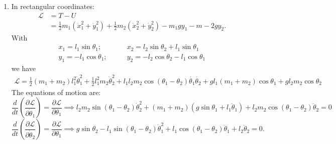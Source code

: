 \documentclass{article}
\theoremstyle{definition}
\newcommand{\p}{\partial}
\newcommand{\lag}{\mathcal{L}}
\newcommand{\f}[2]{\frac{#1}{#2}}
\newcommand{\lp}{\left(}
\newcommand{\rp}{\right)}
\begin{document}
\begin{enumerate}[label=(\alph*)]
	\item In rectangular coordinates:
	\begin{align*}
	\lag 
	&= T - U \\
	&= \f{1}{2}m_1(\dot{x}_1^2 + \dot{y}_1^2) + \f{1}{2}m_2(\dot{x}_2^2 + \dot{y}_2^2) - m_1gy_1 - m-2 g y_2.
	\end{align*}
	With 
	\begin{align*}
	x_1 = l_1 \sin\theta_1; &\quad\quad x_2 = l_2 \sin\theta_2 + l_1 \sin\theta_1 \\
	y_1 = -l_1\cos\theta_1; &\quad\quad y_2 = -l_2\cos\theta_2 - l_1\cos\theta_1
	\end{align*}
	we have
	\begin{align*}
	\boxed{\lag = \f{1}{2}(m_1+m_2) l_1^2\dot{\theta}_1^2  + \f{1}{2}l_1^2m_2\dot{\theta}_2^2 + l_1l_2m_2\cos(\theta_1 - \theta_2) \dot{\theta_1}\dot{\theta_2} + gl_1(m_1+m_2)\cos\theta_1 + gl_2m_2\cos\theta_2}
	\end{align*}
	The equations of motion are:
	\begin{equation*}
	\f{d}{dt}\lp \f{\p \lag}{\p \dot{\theta}_1} \rp = \f{\p \lag}{\p \theta_1} 
	\implies 
	l_2m_2\sin(\theta_1 - \theta_2) \dot{\theta}_2^2 + (m_1+m_2)(g\sin\theta_1 + l_1 \ddot{\theta}_1) + l_2m_2\cos(\theta_1 - \theta_2)\ddot{\theta}_2 = 0
	\end{equation*}
	\begin{equation*}
	\f{d}{dt}\lp \f{\p \lag}{\p \dot{\theta}_2} \rp = \f{\p \lag}{\p \theta_1}
	\implies 
	g\sin\theta_2 - l_1\sin(\theta_1 - \theta_2)\dot{\theta}_1^2 + l_1\cos(\theta_1-\theta_2) \ddot{\theta}_1 + l_2 \ddot{\theta}_2 = 0.
	\end{equation*}
	

\end{enumerate}
\end{document}
